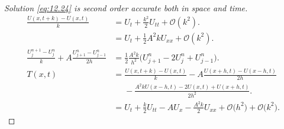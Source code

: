 \begin{frame}
  \frametitle{\secname}

  \begin{proof}[Solution \eqref{eq:12.24} is second order accurate both in space and time]
    \begin{align*}
      \frac{U\left(x,t+k\right)-U\left(x,t\right)}{k}
                                         & =
      U_{t}+
      \frac{k^{2}}{2}U_{tt}+
      \mathcal{O}
      \left(k^{2}\right).                                                                \\
                                         & =
      U_{t}+
      \frac{1}{2}A^{2}kU_{xx}+
      \mathcal{O}
      \left(k^{2}\right).                                                                \\
      \frac{U^{n+1}_{j}-U_{j}^{n}}{k}+
      A
      \frac{U^{n}_{j+1}-U^{n}_{j-1}}{2h} & =
      \frac{1}{2}
      \frac{A^{2}k}{h^{2}}
      \big(
      U^{n}_{j+1}-
      2U^{n}_{j}+
      U^{n}_{j-1}
      \big).                                                                             \\
      T\left(x,t\right)                  & =
      \frac{U\left(x,t+k\right)-U\left(x,t\right)}{k}-
      A\frac{U\left(x+h,t\right)-U\left(x-h,t\right)}{2h}                                \\
                                         & \phantom{=}
      -\frac{A^{2}k U\left(x-h,t\right)-2U\left(x,t\right)+U\left(x+h,t\right)}{2h^{2}}. \\
                                         & =
      U_{t}+\frac{k}{2}U_{tt}-AU_{x}-\frac{A^{2}k}{2}U_{xx}+
      \mathcal{O}\big(h^{2}\big)+
      \mathcal{O}\big(k^{2}\big).
    \end{align*}
  \end{proof}
\end{frame}

